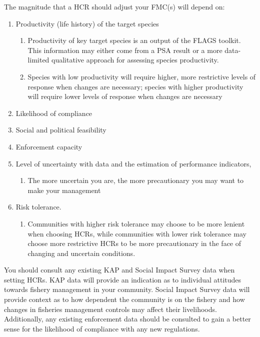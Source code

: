 \documentclass[]{book}
\providecommand{\tightlist}{%
  \setlength{\itemsep}{0pt}\setlength{\parskip}{0pt}}
\begin{document}
The magnitude that a HCR should adjust your FMC(s) will depend on:

\begin{enumerate}
\def\labelenumi{\arabic{enumi}.}
\item
  Productivity (life history) of the target species

  \begin{enumerate}
  \def\labelenumii{\alph{enumii}.}
  \item
    Productivity of key target species is an output of the FLAGS
    toolkit. This information may either come from a PSA result or a
    more data-limited qualitative approach for assessing species
    productivity.
  \item
    Species with low productivity will require higher, more restrictive
    levels of response when changes are necessary; species with higher
    productivity will require lower levels of response when changes are
    necessary
  \end{enumerate}
\item
  Likelihood of compliance
\item
  Social and political feasibility
\item
  Enforcement capacity
\item
  Level of uncertainty with data and the estimation of performance
  indicators,

  \begin{enumerate}
  \def\labelenumii{\alph{enumii}.}
  \tightlist
  \item
    The more uncertain you are, the more precautionary you may want to
    make your management
  \end{enumerate}
\item
  Risk tolerance.

  \begin{enumerate}
  \def\labelenumii{\alph{enumii}.}
  \tightlist
  \item
    Communities with higher risk tolerance may choose to be more lenient
    when choosing HCRs, while communities with lower risk tolerance may
    choose more restrictive HCRs to be more precautionary in the face of
    changing and uncertain conditions.
  \end{enumerate}
\end{enumerate}

You should consult any existing KAP and Social Impact Survey data when
setting HCRs. KAP data will provide an indication as to individual
attitudes towards fishery management in your community. Social Impact
Survey data will provide context as to how dependent the community is on
the fishery and how changes in fisheries management controls may affect
their livelihoods. Additionally, any existing enforcement data should be
consulted to gain a better sense for the likelihood of compliance with
any new regulations.
\end{document}
